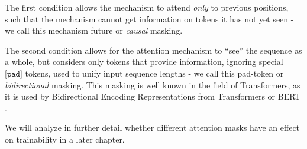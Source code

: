 The first condition allows the mechanism to attend \emph{only} to previous positions, such that the mechanism cannot get information on tokens it has not yet seen - we call this mechanism future or \emph{causal} masking.

The second condition allows for the attention mechanism to ``see'' the sequence as a whole, but considers only tokens that provide information, ignoring special $\texttt{[pad]}$ tokens, used to unify input sequence lengths - we call this pad-token or \emph{bidirectional} masking. This masking is well known in the field of Transformers, as it is used by Bidirectional Encoding Representations from Transformers or BERT \cite{bert}.

We will analyze in further detail whether different attention masks have an effect on trainability in a later chapter.
